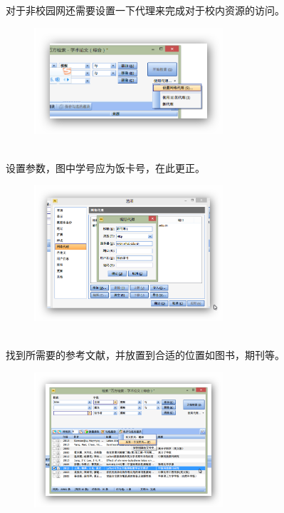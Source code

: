 对于非校园网还需要设置一下代理来完成对于校内资源的访问。
\begin{figure}[htbp]
\centering
\includegraphics[width=7cm]{figure/3}
\end{figure}\\

设置参数，图中学号应为饭卡号，在此更正。
\begin{figure}[htbp]
\centering
\includegraphics[width=7cm]{figure/4}
\end{figure}\\

找到所需要的参考文献，并放置到合适的位置如图书，期刊等。
\begin{figure}[htbp]
\centering
\includegraphics[width=7cm]{figure/5}
\end{figure}\\

